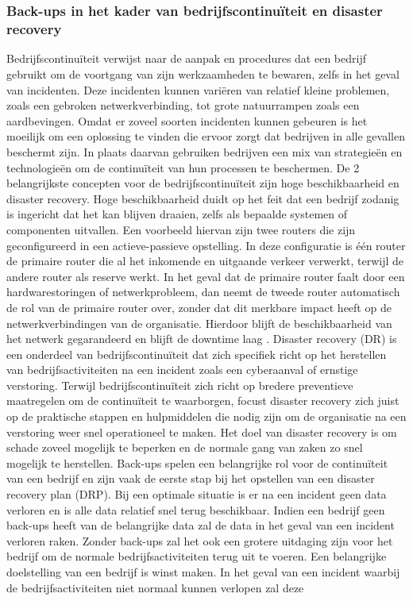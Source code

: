 \chapter{}%
\label{ch:Literatuurstudie}

\subsection{Back-ups in het kader van bedrijfscontinuïteit en disaster recovery}
Bedrijfscontinuïteit verwijst naar de aanpak en procedures dat een bedrijf gebruikt om de voortgang van zijn werkzaamheden te bewaren, zelfs in het geval van incidenten. Deze incidenten kunnen variëren van relatief kleine problemen, zoals een gebroken netwerkverbinding, tot grote natuurrampen zoals een aardbevingen. Omdat er zoveel soorten incidenten kunnen gebeuren is het moeilijk om een oplossing te vinden die ervoor zorgt dat bedrijven in alle gevallen beschermt zijn. In plaats daarvan gebruiken bedrijven een mix van strategieën en technologieën om de continuïteit van hun processen te beschermen. De 2 belangrijkste concepten voor de bedrijfscontinuïteit zijn hoge beschikbaarheid en disaster recovery. Hoge beschikbaarheid duidt op het feit dat een bedrijf zodanig is ingericht dat het kan blijven draaien, zelfs als bepaalde systemen of componenten uitvallen. Een voorbeeld hiervan zijn twee routers die zijn geconfigureerd in een actieve-passieve opstelling. In deze configuratie is één router de primaire router die al het inkomende en uitgaande verkeer verwerkt, terwijl de andere router als reserve werkt. In het geval dat de primaire router faalt door een hardwarestoringen of netwerkprobleem, dan neemt de tweede router automatisch de rol van de primaire router over, zonder dat dit merkbare impact heeft op de netwerkverbindingen van de organisatie. Hierdoor blijft de beschikbaarheid van het netwerk gegarandeerd en blijft de downtime laag \autocite{Zhu2015}. Disaster recovery (DR) is een onderdeel van bedrijfscontinuïteit dat zich specifiek richt op het herstellen van bedrijfsactiviteiten na een incident zoals een cyberaanval of ernstige verstoring. Terwijl bedrijfscontinuïteit zich richt op bredere preventieve maatregelen om de continuïteit te waarborgen, focust disaster recovery zich juist op de praktische stappen en hulpmiddelen die nodig zijn om de organisatie na een verstoring weer snel operationeel te maken. Het doel van disaster recovery is om schade zoveel mogelijk te beperken en de normale gang van zaken zo snel mogelijk te herstellen. Back-ups spelen een belangrijke rol voor de continuïteit van een bedrijf en zijn vaak de eerste stap bij het opstellen van een disaster recovery plan (DRP). Bij een optimale situatie is er na een incident geen data verloren en is alle data relatief snel terug beschikbaar. Indien een bedrijf geen back-ups heeft van de belangrijke data zal de data in het geval van een incident verloren raken. Zonder back-ups zal het ook een grotere uitdaging zijn voor het bedrijf om de normale bedrijfsactiviteiten terug uit te voeren. Een belangrijke doelstelling van een bedrijf is winst maken. In het geval van een incident waarbij de bedrijfsactiviteiten niet normaal kunnen verlopen zal deze 